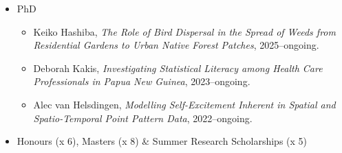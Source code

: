 \documentclass[10pt,a4paper]{moderncv}
\begin{document}
\begin{itemize}
\item PhD
  \begin{itemize}
  \item Keiko Hashiba, \textit{The Role of Bird Dispersal in the Spread of Weeds from Residential Gardens to Urban Native Forest Patches}, 2025--ongoing.
  \item Deborah Kakis, \textit{Investigating Statistical Literacy among Health Care Professionals in Papua New Guinea}, 2023--ongoing.
  \item Alec van Helsdingen, \textit{Modelling Self-Excitement Inherent in Spatial and Spatio-Temporal Point Pattern Data}, 2022--ongoing.
  \end{itemize}
\item Honours (x 6), Masters (x 8) \& Summer Research Scholarships (x 5)

\end{itemize}
\end{document}
